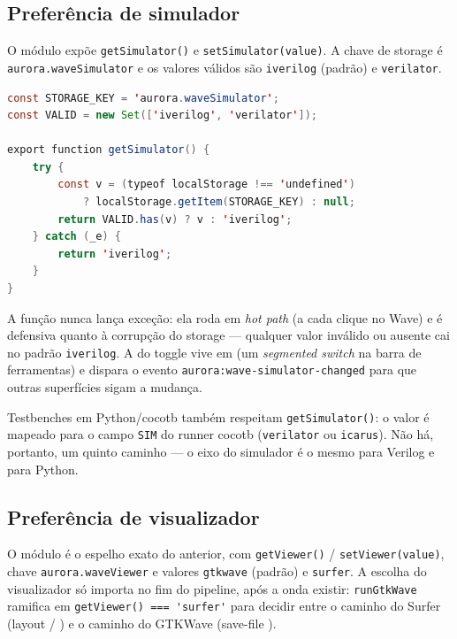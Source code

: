 \subsection{Preferência de simulador}

O módulo  expõe \lstinline|getSimulator()|
e \lstinline|setSimulator(value)|. A chave de storage é
\lstinline|aurora.waveSimulator| e os valores válidos são \lstinline|iverilog|
(padrão) e \lstinline|verilator|.

\begin{lstlisting}[language=Java,caption={Leitura defensiva da preferência de simulador.}]
const STORAGE_KEY = 'aurora.waveSimulator';
const VALID = new Set(['iverilog', 'verilator']);

export function getSimulator() {
    try {
        const v = (typeof localStorage !== 'undefined')
            ? localStorage.getItem(STORAGE_KEY) : null;
        return VALID.has(v) ? v : 'iverilog';
    } catch (_e) {
        return 'iverilog';
    }
}
\end{lstlisting}

A função nunca lança exceção: ela roda em \emph{hot path} (a cada clique no
Wave) e é defensiva quanto à corrupção do storage --- qualquer valor inválido
ou ausente cai no padrão \lstinline|iverilog|. A  do toggle vive em
 (um \emph{segmented switch} na barra de
ferramentas) e dispara o evento \lstinline|aurora:wave-simulator-changed| para
que outras superfícies sigam a mudança.

\begin{nota}
Testbenches em Python/cocotb também respeitam \lstinline|getSimulator()|: o
valor é mapeado para o campo \lstinline|SIM| do runner cocotb
(\lstinline|verilator| ou \lstinline|icarus|). Não há, portanto, um quinto
caminho --- o eixo do simulador é o mesmo para Verilog e para Python.
\end{nota}

\subsection{Preferência de visualizador}

O módulo  é o espelho exato do anterior, com
\lstinline|getViewer()| / \lstinline|setViewer(value)|, chave
\lstinline|aurora.waveViewer| e valores \lstinline|gtkwave| (padrão) e
\lstinline|surfer|. A escolha do visualizador só importa no fim do pipeline,
após a onda existir: \lstinline|runGtkWave| ramifica em
\lstinline|getViewer() === 'surfer'| para decidir entre o caminho do Surfer
(layout  / ) e o caminho do GTKWave (save-file
).

